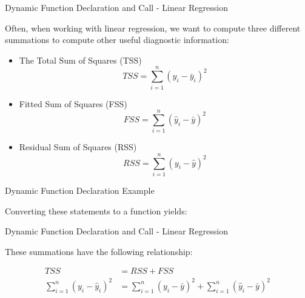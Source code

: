 \begin{frame}{Dynamic Function Declaration and Call - Linear Regression}

Often, when working with linear regression, we want to compute three
different summations to compute other useful diagnostic information:

\begin{itemize}
\tightlist
\item
  The Total Sum of Squares (TSS)
  \[TSS = \sum\limits_{i = 1}^n {{{\left( {{y_i} - {{\bar y}_i}} \right)}^2}}\]
\item
  Fitted Sum of Squares (FSS)
  \[FSS = \sum\limits_{i = 1}^n {{{\left( {{{\hat y}_i} - \bar y} \right)}^2}}\]
\item
  Residual Sum of Squares (RSS)
  \[RSS = \sum\limits_{i = 1}^n {{{\left( {{y_i} - \hat y} \right)}^2}}\]
\end{itemize}

\end{frame}

\begin{frame}[fragile]{Dynamic Function Declaration Example}

Converting these statements to a function yields:

\begin{Shaded}
\begin{Highlighting}[]
\StringTok{ }
  \NormalTok{(}\StringTok{ } \NormalTok{))}
\NormalTok{\}}

\StringTok{ }
  \NormalTok{(}\StringTok{ } \NormalTok{))}
\NormalTok{\}}

\StringTok{ }
  \NormalTok{(}\StringTok{ } \NormalTok{))}
\NormalTok{\}}
\end{Highlighting}
\end{Shaded}

\end{frame}

\begin{frame}{Dynamic Function Declaration and Call - Linear Regression}

These summations have the following relationship:

\[\begin{aligned}
  TSS &= RSS + FSS \\
  \sum\limits_{i = 1}^n {{{\left( {{y_i} - {{\hat y}_i}} \right)}^2}}  &= \sum\limits_{i = 1}^n {{{\left( {{y_i} - \bar y} \right)}^2}}  + \sum\limits_{i = 1}^n {{{\left( {{{\hat y}_i} - \bar y} \right)}^2}}  \\ 
\end{aligned}\]

\end{frame}

